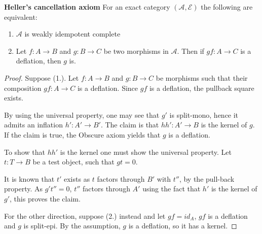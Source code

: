     \begin{prop} \textbf{Heller's cancellation axiom}
        For an exact category $(\mathcal{A},\mathcal{E})$ the following are equivalent:
        \begin{enumerate}
            \item $\mathcal{A}$ is weakly idempotent complete
            \item Let $f: A\rightarrow B$ and $g: B\rightarrow C$ be two morphisms in $\mathcal{A}$. Then if $gf:A\rightarrow C$ is a deflation, then $g$ is.
        \end{enumerate}
    \end{prop}

    \begin{proof}
        Suppose (1.). Let $f:A\rightarrow B$ and $g:B\rightarrow C$ be morphisms such that their composition $gf:A\rightarrow C$ is a deflation. Since $gf$ is a deflation, the pullback square exists.

        \begin{center}
        \end{center}

        By using the universal property, one may see that $g'$ is split-mono, hence it admits an inflation $h':A'\rightarrow B'$. The claim is that $hh':A'\rightarrow B$ is the kernel of $g$. If the claim is true, the Obscure axiom yields that $g$ is a deflation.

        To show that $hh'$ is the kernel one must show the universal property. Let $t:T\rightarrow B$ be a test object, such that $gt=0$.

        \begin{center}
        \end{center}

       It is known that $t'$ exists as $t$ factors through $B'$ with $t''$, by the pull-back property. As $g't''=0$, $t''$ factors through $A'$ using the fact that $h'$ is the kernel of $g'$, this proves the claim.
        
        For the other direction, suppose (2.) instead and let $gf=id_A$,  $gf$ is a deflation and $g$ is split-epi. By the assumption, $g$ is a deflation, so it has a kernel.
    \end{proof}

